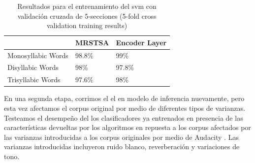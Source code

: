
\begin{table}[h!]
\centering
\caption{Resultados para el entrenamiento del \gls{svm} con validación cruzada de 5-secciones (5-fold cross validation training results)}
\begin{tabular}{|l|l|l|}
\hline
		   & MRSTSA & Encoder Layer \\ \hline
Monosyllabic Words & 98.8\% & 99\%          \\ \hline
Disyllabic Words   & 98\%   & 97.8\%        \\ \hline
Trisyllabic Words  & 97.6\% & 98\%          \\ \hline
\end{tabular}
\label{SVM_Training}
\end{table}

\pagebreak

En una segunda etapa, corrimos el \gls{el} en modelo de inferencia nuevamente, pero esta vez afectamos el corpus original por medio de diferentes tipos de varianzas. Testeamos el desempeño del los clasificadores ya entrenados en presencia de las características devueltas por los algoritmos en repuesta a los corpus afectados por las varianzas introducidas a los corpus originales por medio de Audacity \cite{audacity}. Las varianzas introducidas incluyeron ruido blanco, reverberación y variaciones de tono. 



